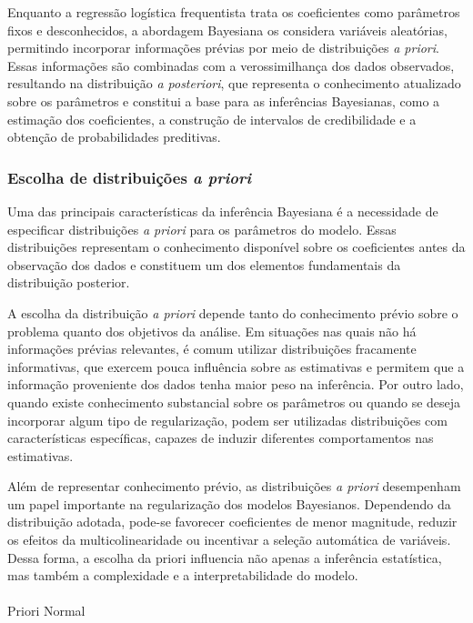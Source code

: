 \documentclass[
  brazilian,
  12pt,
  letterpaper,
  DIV=11,
  numbers=noendperiod]{scrartcl}
\makeatletter
\let\oldparagraph\paragraph
\renewcommand{\paragraph}{
    \@ifstar
      \xxxParagraphStar
      \xxxParagraphNoStar
  }
\newcommand{\xxxParagraphStar}[1]{\oldparagraph*{#1}\mbox{}}
\newcommand{\xxxParagraphNoStar}[1]{\oldparagraph{#1}\mbox{}}
\makeatother
\begin{document}
Enquanto a regressão logística frequentista trata os coeficientes como
parâmetros fixos e desconhecidos, a abordagem Bayesiana os considera
variáveis aleatórias, permitindo incorporar informações prévias por meio
de distribuições \emph{a priori}. Essas informações são combinadas com a
verossimilhança dos dados observados, resultando na distribuição \emph{a
posteriori}, que representa o conhecimento atualizado sobre os
parâmetros e constitui a base para as inferências Bayesianas, como a
estimação dos coeficientes, a construção de intervalos de credibilidade
e a obtenção de probabilidades preditivas.

\subsubsection{\texorpdfstring{Escolha de distribuições \emph{a
priori}}{Escolha de distribuições a priori}}\label{escolha-de-distribuiuxe7uxf5es-a-priori}

Uma das principais características da inferência Bayesiana é a
necessidade de especificar distribuições \emph{a priori} para os
parâmetros do modelo. Essas distribuições representam o conhecimento
disponível sobre os coeficientes antes da observação dos dados e
constituem um dos elementos fundamentais da distribuição posterior.

A escolha da distribuição \emph{a priori} depende tanto do conhecimento
prévio sobre o problema quanto dos objetivos da análise. Em situações
nas quais não há informações prévias relevantes, é comum utilizar
distribuições fracamente informativas, que exercem pouca influência
sobre as estimativas e permitem que a informação proveniente dos dados
tenha maior peso na inferência. Por outro lado, quando existe
conhecimento substancial sobre os parâmetros ou quando se deseja
incorporar algum tipo de regularização, podem ser utilizadas
distribuições com características específicas, capazes de induzir
diferentes comportamentos nas estimativas.

Além de representar conhecimento prévio, as distribuições \emph{a
priori} desempenham um papel importante na regularização dos modelos
Bayesianos. Dependendo da distribuição adotada, pode-se favorecer
coeficientes de menor magnitude, reduzir os efeitos da
multicolinearidade ou incentivar a seleção automática de variáveis.
Dessa forma, a escolha da priori influencia não apenas a inferência
estatística, mas também a complexidade e a interpretabilidade do modelo.

\paragraph{Priori Normal}\label{priori-normal}
\end{document}
